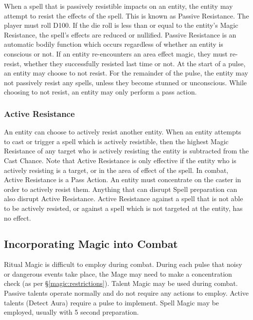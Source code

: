 \begin{multicols*}{3}
When a spell that is passively resistible impacts on an entity, the
entity may attempt to resist the effects of the spell. This is known
as Passive Resistance. The player must roll D100. If the die roll is
less than or equal to the entity's Magic Resistance, the spell's
effects are reduced or nullified. Passive Resistance is an automatic
bodily function which occurs regardless of whether an entity is
conscious or not. If an entity re-encounters an area effect magic,
they must re-resist, whether they successfully resisted last time or
not. At the start of a pulse, an entity may choose to not resist. For
the remainder of the pulse, the entity may not passively resist any
spells, unless they become stunned or unconscious. While choosing to
not resist, an entity may only perform a pass action.

\subsubsection{Active Resistance}

An entity can choose to actively resist another entity. When an entity
attempts to cast or trigger a spell which is actively resistible, then
the highest Magic Resistance of any target who is actively resisting
the entity is subtracted from the Cast Chance. Note that Active
Resistance is only effective if the entity who is actively resisting
is a target, or in the area of effect of the spell. In combat, Active
Resistance is a Pass Action. An entity must concentrate on the caster
in order to actively resist them. Anything that can disrupt Spell
preparation can also disrupt Active Resistance. Active Resistance
against a spell that is not able to be actively resisted, or against a
spell which is not targeted at the entity, has no effect.

\subsection{Incorporating Magic into Combat}
\label{magic:combat}

Ritual Magic is difficult to employ during combat. During each pulse
that noisy or dangerous events take place, the Mage may need to make a
concentration check (as per \S\ref{magic:restrictions}). Talent Magic
may be used during combat.  Passive talents operate normally and do
not require any actions to employ. Active talents (\eg Detect Aura)
require a pulse to implement. Spell Magic may be employed, usually
with 5 second preparation.


\end{multicols*}
